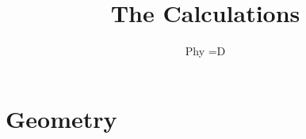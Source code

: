 \documentclass[10.5pt,oneside]{book}
\begin{document}
\title{The Calculations}
\author{Phy =D}
\maketitle

\hypersetup{
    colorlinks=false, %
    linktoc=all,     %
}
\tableofcontents

\chapter{Geometry}

\end{document}
